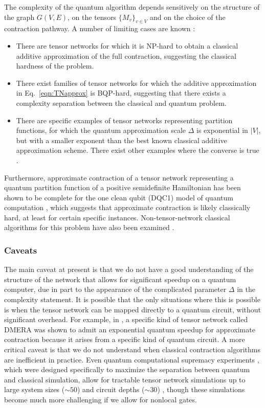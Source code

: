 \begin{refsection}
The complexity of the quantum algorithm depends sensitively on the structure of the graph $G(V,E)$, on the tensors $\{M_v\}_{v\in V}$ and on the choice of the contraction pathway. A number of limiting cases are known \cite{arad2010quantum}: 
\begin{itemize}
    \item There are tensor networks for which it is NP-hard to obtain a classical additive approximation of the full contraction, 
    suggesting the classical hardness of the problem. 
    \item There exist families of tensor networks for which the additive approximation in Eq.~\eqref{eqn:TNapprox} is BQP-hard, suggesting that there exists a complexity separation between the classical and quantum problem. 
    \item There are specific examples of tensor networks representing partition functions, for which the quantum approximation scale $\Delta$ is exponential in $|V|$, but with a smaller exponent than the best known classical additive approximation scheme. There exist other examples where the converse is true \cite{arad2010quantum}.
\end{itemize}

Furthermore, approximate contraction of a  tensor network representing a quantum partition function of a positive semidefinite Hamiltonian has been shown to be complete for the one clean qubit (DQC1) model of quantum computation \cite{chowdhury2021computing}, which suggests that approximate contraction is likely classically hard, at least for certain specific instances. Non-tensor-network classical algorithms for this problem have also been examined \cite{jackson2023partition}. 



\subsubsection*{Caveats}

The main caveat at present is that we do not have a good understanding of the structure of the network that allows for significant speedup on  a quantum computer, due in part to the appearance of the complicated parameter $\Delta$ in the complexity statement. It is possible that the only situations where this is possible is when the tensor network can be mapped directly to a quantum circuit, without significant overhead. For example, in \cite{kim2017robustEntanglementRenormalization}, a specific kind of tensor network called DMERA was shown to admit an exponential quantum speedup for approximate contraction because it arises from a specific kind of quantum circuit. A more critical caveat is that we do not understand when classical contraction algorithms are inefficient in practice. Even quantum computational supremacy experiments \cite{arute2019quantum}, which were designed specifically to maximize the separation between quantum and classical simulation, allow for tractable tensor network simulations up to large system sizes ($\sim 50$) and circuit depths ($\sim 30$) \cite{pan2021simulating}, though these simulations become much more challenging if we allow for nonlocal gates. 


\end{refsection}
